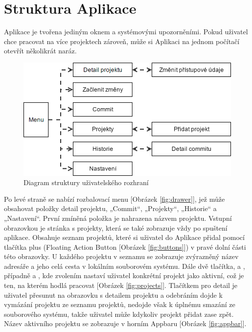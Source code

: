 \section{Struktura Aplikace}

Aplikace je tvořena jediným oknem a systémovými upozorněními. Pokud uživatel chce pracovat na více projektech zároveň, může si Aplikaci na jednom počítačí otevřít několikrát naráz.

\FloatBarrier
\begin{figure}[ht]
	\centering
	\includegraphics[width=\textwidth]{sections/ui/images/flow.png}
	\caption{Diagram struktury uživatelského rozhraní}
\end{figure}
\FloatBarrier

Po levé straně se nabízí rozbalovací menu [Obrázek \ref{fig:drawer}], jež může obsahovat položky detail projektu, „Commit“, „Projekty“, „Historie“ a „Nastavení“. První zmíněná položka je nahrazena názvem projektu. Vstupní obrazovkou je stránka s projekty, která se také zobrazuje vždy po spuštení aplikace. Obsahuje seznam projektů, které si uživatel do Aplikace přidal pomocí tlačítka plus (Floating Action Button [Obrázek \ref{fig:buttons}]) v pravé dolní části této obrazovky. U každého projektu v seznamu se zobrazuje zvýrazněný název adresáře a jeho celá cesta v lokálním souborovém systému. Dále dvě tlačítka,  a , případně  a , kde zvolením nastaví uživatel konkrétní projekt jako aktivní, což je ten, na kterém hodlá pracovat [Obrázek \ref{fig:projects}]. Tlačítkem pro detail je uživatel přesunut na obrazovku s detailem projektu a odebráním dojde k vymázání projektu ze seznamu projektů, nedojde však k úplnému smazání ze souborového systému, takže uživatel může kdykoliv projekt přidat zase zpět. Název aktivního projektu se zobrazuje v horním Appbaru [Obrázek \ref{fig:appbar}].

